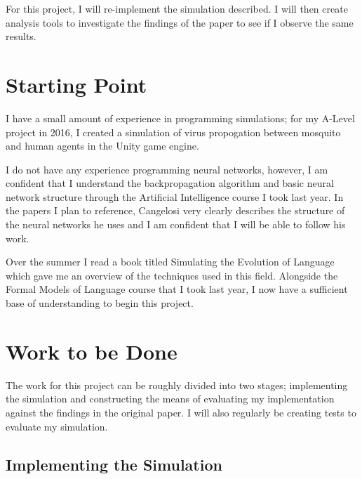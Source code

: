 \documentclass[12pt,a4paper,twoside]{article}
\begin{document}
For this project, I will re-implement the simulation described. I will then create analysis tools to investigate the findings of the paper to see if I observe the same results.

\section*{Starting Point}

I have a small amount of experience in programming simulations; for my A-Level project in 2016, I created a simulation of virus propogation between mosquito and human agents in the Unity game engine.

I do not have any experience programming neural networks, however, I am confident that I understand the backpropagation algorithm and basic neural network structure through the Artificial Intelligence course I took last year. In the papers I plan to reference, Cangelosi very clearly describes the structure of the neural networks he uses and I am confident that I will be able to follow his work.

Over the summer I read a book titled Simulating the Evolution of Language which gave me an overview of the techniques used in this field. Alongside the Formal Models of Language course that I took last year, I now have a sufficient base of understanding to begin this project.

\section*{Work to be Done}

The work for this project can be roughly divided into two stages; implementing the simulation and constructing the means of evaluating my implementation against the findings in the original paper. I will also regularly be creating tests to evaluate my simulation.

\subsection*{Implementing the Simulation}
\end{document}
